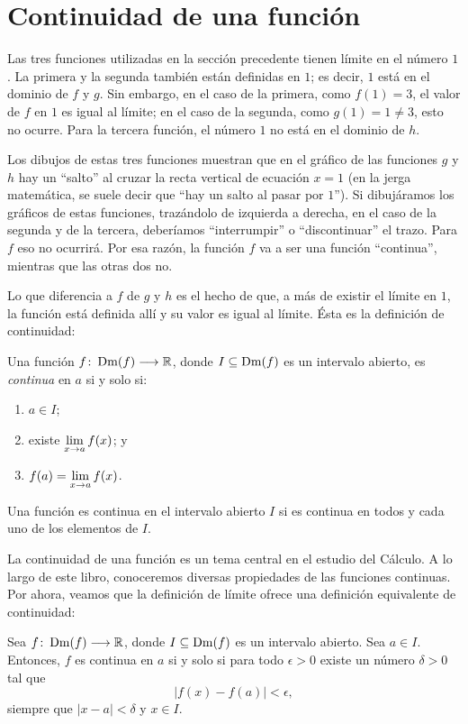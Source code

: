 \section{Continuidad de una función} Las tres funciones utilizadas en la sección precedente tienen
límite en el número $1$. La primera y la segunda también están definidas en $1$; es decir, $1$ está
en el dominio de $f$ y $g$. Sin embargo, en el caso de la primera, como $f(1) = 3$, el valor de $f$
en $1$ es igual al límite; en el caso de la segunda, como $g(1) = 1 \neq 3$, esto no ocurre. Para
la tercera función, el número $1$ no está en el dominio de $h$.

Los dibujos de estas tres funciones muestran que en el gráfico de las funciones $g$ y $h$ hay un
``salto'' al cruzar la recta vertical de ecuación $x = 1$ (en la jerga matemática, se suele decir
que ``hay un salto al pasar por $1$''). Si dibujáramos los gráficos de estas funciones, trazándolo
de izquierda a derecha, en el caso de la segunda y de la tercera, deberíamos ``interrumpir'' o
``discontinuar'' el trazo. Para $f$ eso no ocurrirá. Por esa razón, la función $f$ va a ser una
función ``continua'', mientras que las otras dos no.

Lo que diferencia a $f$ de $g$ y $h$ es el hecho de que, a más de existir el límite en $1$, la
función está definida allí y su valor es igual al límite. Ésta es la definición de continuidad:

\begin{defical}
Una función $\funcjc{f}{\Dm(f)}{\mathbb{R}}$, donde $I\subseteq \Dm(f)$ es un intervalo abierto, es
\emph{continua} en $a$ si y solo si:
\begin{enumerate}
\item $a\in I$;
\item existe $\displaystyle\limjc{f(x)}{x}{a}$; y
\item $\displaystyle f(a) = \limjc{f(x)}{x}{a}$.
\end{enumerate}
Una función es continua en el intervalo abierto $I$ si es continua en todos y cada uno de los
elementos de $I$.
\end{defical}

La continuidad de una función es un tema central en el estudio del Cálculo. A lo largo de este
libro, conoceremos diversas propiedades de las funciones continuas. Por ahora, veamos que la
definición de límite ofrece una definición equivalente de continuidad:

\begin{teocal}%
Sea $\funcjc{f}{\Dm(f)}{\mathbb{R}}$, donde $I\subseteq\Dm(f)$ es un intervalo abierto. Sea $a\in
I$. Entonces, $f$ es continua en $a$ si y solo si para todo $\epsilon > 0$ existe un número $\delta
> 0$ tal que
\[
|f(x) - f(a)| < \epsilon,
\]
siempre que $|x - a| < \delta$ y $x \in I$.
\end{teocal}

